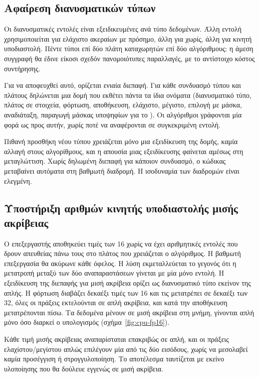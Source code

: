 \subsection{Αφαίρεση διανυσματικών τύπων}
\label{sec:cpu-simd-traits}

Οι διανυσματικές εντολές είναι εξειδικευμένες ανά τύπο δεδομένων. Άλλη εντολή
χρησιμοποιείται για ελάχιστο ακεραίων με πρόσημο, άλλη για χωρίς, άλλη για
κινητή υποδιαστολή. Πέντε τύποι επί δύο πλάτη καταχωρητών επί δύο αλγόριθμους:
η άμεση συγγραφή θα έδινε είκοσι σχεδόν πανομοιότυπες παραλλαγές, με το
αντίστοιχο κόστος συντήρησης.

Για να αποφευχθεί αυτό, ορίζεται ενιαία διεπαφή. Για κάθε συνδυασμό τύπου και
πλάτους δηλώνεται μια δομή που εκθέτει πάντα τα ίδια ονόματα (διανυσματικό
τύπο, πλάτος σε στοιχεία, φόρτωση, αποθήκευση, ελάχιστο, μέγιστο, επιλογή με
μάσκα, αναδιάταξη, παραγωγή μάσκας υποψηφίων για το ). Οι
αλγόριθμοι γράφονται μία φορά ως προς αυτήν, χωρίς ποτέ να αναφέρονται σε
συγκεκριμένη εντολή.

Πιθανή προσθήκη νέου τύπου χρειάζεται μόνο μια εξειδίκευση της δομής, καμία
αλλαγή στους αλγορίθμους, και η απουσία μιας εξειδίκευσης φαίνεται αμέσως στη
μεταγλώττιση. Χωρίς δηλωμένη διεπαφή για κάποιον συνδυασμό, ο κώδικας
μεταβαίνει αυτόματα στη βαθμωτή διαδρομή. Η ισοδυναμία των διαδρομών είναι
ελεγμένη.

\subsection{Υποστήριξη αριθμών κινητής υποδιαστολής μισής ακρίβειας}
\label{sec:cpu-fp16}

Ο επεξεργαστής αποθηκεύει τιμές των 16  χωρίς να έχει αριθμητικές
εντολές που δρουν απευθείας πάνω τους στο πλάτος που χρειάζεται ο αλγόριθμος. Η
βαθμωτή επεξεργασία θα ακύρωνε κάθε όφελος. Η λύση εκμεταλλεύεται το γεγονός
ότι η μετατροπή μεταξύ των δύο αναπαραστάσεων γίνεται με μία μόνο εντολή. Η
εξειδίκευση της διεπαφής για μισή ακρίβεια ορίζει ως διανυσματικό τύπο εκείνον
της απλής. Η φόρτωση διαβάζει δεκαέξι τιμές των 16  και τις μετατρέπει
σε δεκαέξι των 32, όλες οι πράξεις εκτελούνται σε απλή ακρίβεια, και κατά την
αποθήκευση μετατρέπονται πίσω. Τα δεδομένα μένουν σε μισή ακρίβεια στη μνήμη,
γίνονται απλή μόνο όσο διαρκεί ο υπολογισμός (σχήμα~\ref{fig:cpu-fp16}).



Κάθε τιμή μισής ακρίβειας αναπαρίσταται επακριβώς σε απλή, και οι πράξεις
ελαχίστου/μεγίστου απλώς επιλέγουν μία από τις δύο εισόδους, χωρίς να μεσολαβεί
καμία προσέγγιση ή στρογγυλοποίηση. Το αποτέλεσμα ταυτίζεται με εκείνο
υλοποίησης που θα δούλευε εγγενώς σε μισή ακρίβεια.

